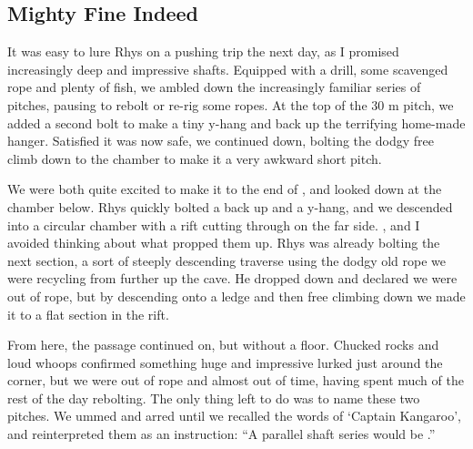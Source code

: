 \subsection{Mighty Fine Indeed}
\begin{marginfigure}
\end{marginfigure}
It was easy to lure Rhys on a pushing trip the next day, as I promised increasingly deep and impressive shafts. Equipped with a drill, some scavenged rope and plenty of fish, we ambled down the increasingly familiar series of pitches, pausing to rebolt or re-rig some ropes. At the top of the 30 m  pitch, we added a second bolt to make a tiny y-hang and back up the terrifying home-made hanger. Satisfied it was now safe, we continued down, bolting the dodgy free climb down to the  chamber to make it a very awkward short pitch.
 
We were both quite excited to make it to the end of , and looked down at the chamber below. Rhys quickly bolted a back up and a y-hang, and we descended into a circular chamber with a rift cutting through on the far side. , and I avoided thinking about what propped them up. Rhys was already bolting the next section, a sort of steeply descending traverse using the dodgy old rope we were recycling from further up the cave. He dropped down and declared we were out of rope, but by descending onto a ledge and then free climbing down we made it to a flat section in the rift.
 
From here, the passage continued on, but without a floor. Chucked rocks and loud whoops confirmed something huge and impressive lurked just around the corner, but we were out of rope and almost out of time, having spent much of the rest of the day rebolting. The only thing left to do was to name these two pitches. We ummed and arred until we recalled the words of ‘Captain Kangaroo’, and reinterpreted them as an instruction: “A parallel shaft series would be .”

